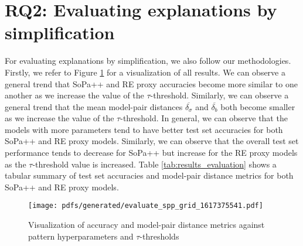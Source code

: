 \section{RQ2: Evaluating explanations by simplification}

For evaluating explanations by simplification, we also follow our methodologies.
Firstly, we refer to Figure \ref{fig:explain_evaluate} for a visualization of
all results. We can observe a general trend that SoPa++ and RE proxy accuracies
become more similar to one another as we increase the value of the
$\tau$-threshold. Similarly, we can observe a general trend that the mean
model-pair distances $\overline{\delta_{\sigma}}$ and $\overline{\delta_b}$ both
become smaller as we increase the value of the $\tau$-threshold. In general, we
can observe that the models with more parameters tend to have better test set
accuracies for both SoPa++ and RE proxy models. Similarly, we can observe that
the overall test set performance tends to decrease for SoPa++ but increase for
the RE proxy models as the $\tau$-threshold value is increased. Table
\ref{tab:results_evaluation} shows a tabular summary of test set accuracies and
model-pair distance metrics for both SoPa++ and RE proxy models. 

\begin{figure}[t!]
  \centering
  \texttt{[image: pdfs/generated/evaluate\_spp\_grid\_1617375541.pdf]}
  \caption{Visualization of accuracy and model-pair distance metrics against
    pattern hyperparameters and $\tau$-thresholds}
  \label{fig:explain_evaluate}
\end{figure}

